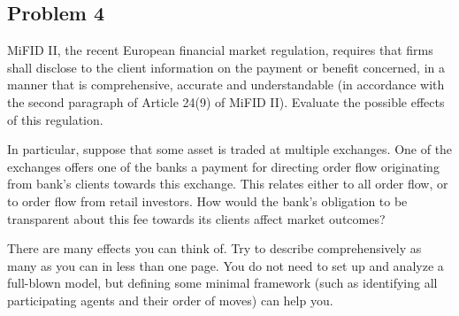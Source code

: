 \documentclass[11pt
, answers
]{exam}
\begin{document}
\quad
\subsection*{Problem 4}

MiFID II, the recent European financial market regulation, requires that firms shall disclose to the client information on the payment or benefit concerned, in a manner that is comprehensive, accurate and understandable (in accordance with the second paragraph of Article 24(9) of MiFID II). Evaluate the possible effects of this regulation.

In particular, suppose that some asset is traded at multiple exchanges. One of the exchanges offers one of the banks a payment for directing order flow originating from bank's clients towards this exchange. This relates either to all order flow, or to order flow from retail investors. How would the bank's obligation to be transparent about this fee towards its clients affect market outcomes?

There are many effects you can think of. Try to describe comprehensively as many as you can in less than one page. You do not need to set up and analyze a full-blown model, but defining some minimal framework (such as identifying all participating agents and their order of moves) can help you.
\end{document}
